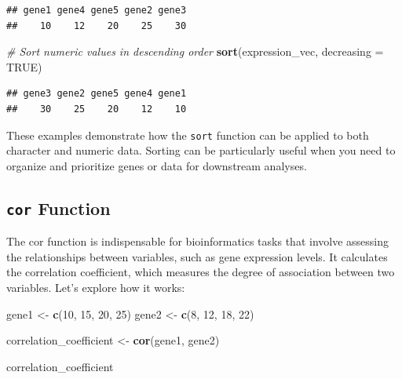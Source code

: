 \documentclass[
]{book}
\newenvironment{Shaded}{\begin{snugshade}}{\end{snugshade}}
\newcommand{\AttributeTok}[1]{\textcolor[rgb]{0.13,0.29,0.53}{#1}}
\newcommand{\CommentTok}[1]{\textcolor[rgb]{0.56,0.35,0.01}{\textit{#1}}}
\newcommand{\ConstantTok}[1]{\textcolor[rgb]{0.56,0.35,0.01}{#1}}
\newcommand{\DecValTok}[1]{\textcolor[rgb]{0.00,0.00,0.81}{#1}}
\newcommand{\FunctionTok}[1]{\textcolor[rgb]{0.13,0.29,0.53}{\textbf{#1}}}
\newcommand{\NormalTok}[1]{#1}
\newcommand{\OtherTok}[1]{\textcolor[rgb]{0.56,0.35,0.01}{#1}}
\begin{document}
\begin{verbatim}
## gene1 gene4 gene5 gene2 gene3 
##    10    12    20    25    30
\end{verbatim}

\begin{Shaded}
\begin{Highlighting}[]
\CommentTok{\# Sort numeric values in descending order}
\FunctionTok{sort}\NormalTok{(expression\_vec, }\AttributeTok{decreasing =} \ConstantTok{TRUE}\NormalTok{)}
\end{Highlighting}
\end{Shaded}

\begin{verbatim}
## gene3 gene2 gene5 gene4 gene1 
##    30    25    20    12    10
\end{verbatim}

These examples demonstrate how the \texttt{sort} function can be applied to both character and numeric data. Sorting can be particularly useful when you need to organize and prioritize genes or data for downstream analyses.

\hypertarget{cor-function}{%
\subsection{\texorpdfstring{\texttt{cor} Function}{cor Function}}\label{cor-function}}

The cor function is indispensable for bioinformatics tasks that involve assessing the relationships between variables, such as gene expression levels. It calculates the correlation coefficient, which measures the degree of association between two variables. Let's explore how it works:

\begin{Shaded}
\begin{Highlighting}[]
\NormalTok{gene1 }\OtherTok{\textless{}{-}} \FunctionTok{c}\NormalTok{(}\DecValTok{10}\NormalTok{, }\DecValTok{15}\NormalTok{, }\DecValTok{20}\NormalTok{, }\DecValTok{25}\NormalTok{)}
\NormalTok{gene2 }\OtherTok{\textless{}{-}} \FunctionTok{c}\NormalTok{(}\DecValTok{8}\NormalTok{, }\DecValTok{12}\NormalTok{, }\DecValTok{18}\NormalTok{, }\DecValTok{22}\NormalTok{)}

\NormalTok{correlation\_coefficient }\OtherTok{\textless{}{-}} \FunctionTok{cor}\NormalTok{(gene1, gene2)}

\NormalTok{correlation\_coefficient}
\end{Highlighting}
\end{Shaded}
\end{document}
